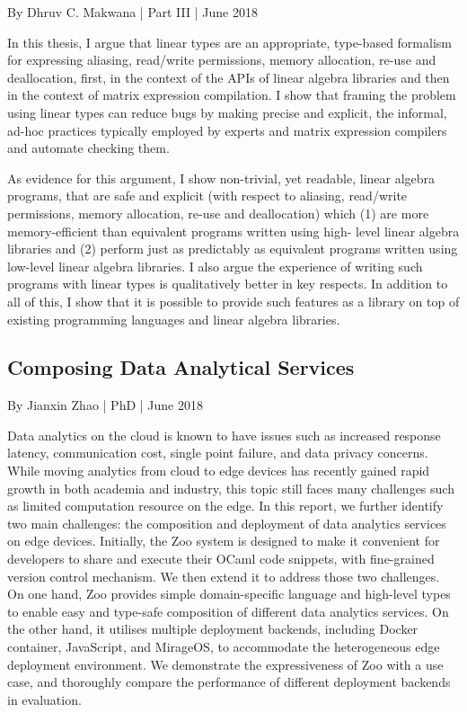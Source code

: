 By Dhruv C. Makwana | Part III | June 2018

In this thesis, I argue that linear types are an appropriate, type-based formalism for expressing aliasing, read/write permissions, memory allocation, re-use and deallocation, first, in the context of the APIs of linear algebra libraries and then in the context of matrix expression compilation. I show that framing the problem using linear types can reduce bugs by making precise and explicit, the informal, ad-hoc practices typically employed by experts and matrix expression compilers and automate checking them.

As evidence for this argument, I show non-trivial, yet readable, linear algebra programs, that are safe and explicit (with respect to aliasing, read/write permissions, memory allocation, re-use and deallocation) which (1) are more memory-efficient than equivalent programs written using high- level linear algebra libraries and (2) perform just as predictably as equivalent programs written using low-level linear algebra libraries. I also argue the experience of writing such programs with linear types is qualitatively better in key respects. In addition to all of this, I show that it is possible to provide such features as a library on top of existing programming languages and linear algebra libraries.


\hypertarget{Composing Data Analytical Services}{%
\subsection{Composing Data Analytical Services}\label{theses-zoo}}

By Jianxin Zhao | PhD | June 2018

Data analytics on the cloud is known to have issues such as increased response latency, communication cost, single point failure, and data privacy concerns. While moving analytics from cloud to edge devices has recently gained rapid growth in both academia and industry, this topic still faces many challenges such as limited computation resource on the edge. In this report, we further identify two main challenges: the composition and deployment of data analytics services on edge devices. Initially, the Zoo system is designed to make it convenient for developers to share and execute their OCaml code snippets, with fine-grained version control mechanism. We then extend it to address those two challenges. On one hand, Zoo provides simple domain-specific language and high-level types to enable easy and type-safe composition of different data analytics services. On the other hand, it utilises multiple deployment backends, including Docker container, JavaScript, and MirageOS, to accommodate the heterogeneous edge deployment environment. We demonstrate the expressiveness of Zoo with a use case, and thoroughly compare the performance of different deployment backends in evaluation.



